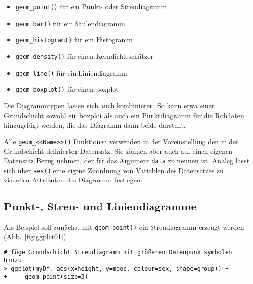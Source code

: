 \begin{itemize}
\item {} \lstinline!geom_point()! für ein Punkt- oder Streudiagramm
\item {} \lstinline!geom_bar()! für ein Säulendiagramm
\item {} \lstinline!geom_histogram()! für ein Histogramm
\item {} \lstinline!geom_density()! für einen Kerndichteschätzer
\item {} \lstinline!geom_line()! für ein Liniendiagramm
\item {} \lstinline!geom_boxplot()! für einen boxplot
\end{itemize}

Die Diagrammtypen lassen sich auch kombinieren: So kann etwa einer Grundschicht sowohl ein boxplot als auch ein Punktdiagramm für die Rohdaten hinzugefügt werden, die das Diagramm dann beide darstellt.

Alle \lstinline!geom_<<Name>>()! Funktionen verwenden in der Voreinstellung den in der Grundschicht definierten Datensatz. Sie können aber auch auf einen eigenen Datensatz Bezug nehmen, der für das Argument \lstinline!data! zu nennen ist. Analog lässt sich über \lstinline!aes()! eine eigene Zuordnung von Variablen des Datensatzes zu visuellen Attributen des Diagramms festlegen.

\subsection{Punkt-, Streu- und Liniendiagramme}
\label{sec:ggplotPoint}

Als Beispiel soll zunächst mit \lstinline!geom_point()! ein Streudiagramm erzeugt werden (Abb.\ \ref{fig:ggplot01}).
\begin{lstlisting}
# füge Grundschicht Streudiagramm mit größeren Datenpunktsymbolen hinzu
> ggplot(myDf, aes(x=height, y=mood, colour=sex, shape=group)) +
+     geom_point(size=3)
\end{lstlisting}

